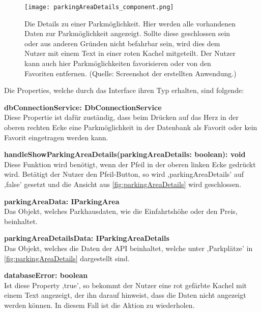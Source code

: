 \begin{figure}[h!]
	\centering
	\texttt{[image: parkingAreaDetails\_component.png]}
	\caption[Die Details zu einer Parkmöglichkeit. Hier werden alle vorhandenen Daten zur Parkmöglichkeit angezeigt. Sollte diese geschlossen sein oder aus anderen Gründen nicht befahrbar sein, wird dies dem Nutzer mit einem Text in einer roten Kachel mitgeteilt. Der Nutzer kann auch hier Parkmöglichkeiten favorisieren oder von den Favoriten entfernen.]
	{Die Details zu einer Parkmöglichkeit. Hier werden alle vorhandenen Daten zur Parkmöglichkeit angezeigt. Sollte diese geschlossen sein oder aus anderen Gründen nicht befahrbar sein, wird dies dem Nutzer mit einem Text in einer roten Kachel mitgeteilt. Der Nutzer kann auch hier Parkmöglichkeiten favorisieren oder von den Favoriten entfernen. (Quelle: Screenshot der erstellten Anwendung.)}
	\label{fig:parkingAreaDetails}
\end{figure}
\newpage
Die Properties, welche durch das Interface ihren Typ erhalten, sind folgende: 
\begin{description}
	\item \textbf{dbConnectionService: DbConnectionService} \\ Diese Propertie ist dafür zuständig, dass beim Drücken auf das Herz in der oberen rechten Ecke eine Parkmöglichkeit in der Datenbank als Favorit oder kein Favorit eingetragen werden kann.
	\item \textbf{handleShowParkingAreaDetails(parkingAreaDetails: boolean): void} \\ Diese Funktion wird benötigt, wenn der Pfeil in der oberen linken Ecke gedrückt wird. Betätigt der Nutzer den Pfeil-Button, so wird ,parkingAreaDetails' auf ,false' gesetzt und die Ansicht aus \autoref{fig:parkingAreaDetails} wird geschlossen.
	\item \textbf{parkingAreaData: IParkingArea} \\ Das Objekt, welches Parkhausdaten, wie die Einfahrtshöhe oder den Preis, beinhaltet.
	\item \textbf{parkingAreaDetailsData: IParkingAreaDetails} \\ Das Objekt, welches die Daten der API beinhaltet, welche unter ,Parkplätze' in \autoref{fig:parkingAreaDetails} dargestellt sind.
	\newpage
	\item \textbf{databaseError: boolean} \\ Ist diese Property ,true', so bekommt der Nutzer eine rot gefärbte Kachel mit einem Text angezeigt, der ihn darauf hinweist, dass die Daten nicht angezeigt werden können. In diesem Fall ist die Aktion zu wiederholen.
\end{description}

